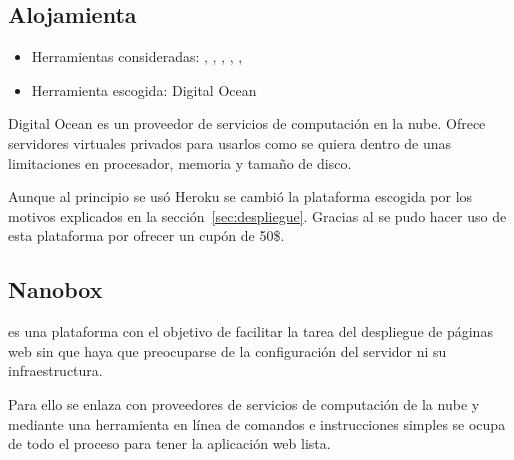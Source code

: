 \subsection{Alojamienta}

\begin{itemize}
	\tightlist
	\item Herramientas consideradas: , , ,
	,
	,
	\item Herramienta escogida: Digital Ocean
\end{itemize}

Digital Ocean es un proveedor de servicios de computación en la nube. Ofrece servidores virtuales privados para usarlos como se quiera dentro de unas limitaciones en procesador, memoria y tamaño de disco.

Aunque al principio se usó Heroku se cambió la plataforma escogida por los motivos explicados en la sección~\ref{sec:despliegue}. Gracias al  se pudo hacer uso de esta plataforma por ofrecer un cupón de 50\$.

\subsection{Nanobox}

 es una plataforma con el objetivo de facilitar la tarea del despliegue de páginas web sin que haya que preocuparse de la configuración del servidor ni su infraestructura.

Para ello se enlaza con proveedores de servicios de computación de la nube y mediante una herramienta en línea de comandos e instrucciones simples se ocupa de todo el proceso para tener la aplicación web lista.
